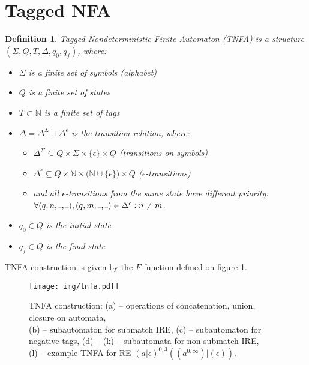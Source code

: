 \documentclass[AMA,STIX1COL]{WileyNJD-v2}
\newcommand{\Xund}{\rule{.4em}{.4pt}}
\newcommand{\YN}{\mathbb{N}}
\newtheorem{Xdef}{Definition}
\begin{document}
\FloatBarrier


\section{Tagged NFA}

    \begin{Xdef}
    \emph{Tagged Nondeterministic Finite Automaton (TNFA)}
    is a structure $(\Sigma, Q, T, \Delta, q_0, q_f)$, where:
    \begin{itemize}
        \item[] $\Sigma$ is a finite set of symbols (\emph{alphabet})
        \item[] $Q$ is a finite set of \emph{states}
        \item[] $T\subset\YN$ is a finite set of \emph{tags}
        \item[] $\Delta = \Delta^\Sigma \sqcup \Delta^\epsilon$ is the \emph{transition} relation, where:
        \begin{itemize}
            \item[] $\Delta^\Sigma \subseteq Q \times \Sigma \times \{\epsilon\} \times Q$ (transitions on symbols)
            \item[] $\Delta^\epsilon \subseteq Q \times \YN \times \big( \YN \cup \{\epsilon\} \big) \times Q$ ($\epsilon$-transitions)
            \item[]
                and all $\epsilon$-transitions from the same state have different priority:
                $\forall (q, n, \Xund, \Xund), (q, m, \Xund, \Xund) \in \Delta^\epsilon: n \neq m$.
        \end{itemize}
        \item[] $q_0 \in Q$ is the \emph{initial} state
        \item[] $q_f \in Q$ is the \emph{final} state
    \end{itemize}
    \end{Xdef}

TNFA construction is given by the $F$ function defined on figure \ref{fig_tnfa}.

\begin{figure}\label{fig_tnfa}
\texttt{[image: img/tnfa.pdf]}
\caption{
TNFA construction:
(a) -- operations of concatenation, union, closure on automata, \\
(b) -- subautomaton for submatch IRE,
(c) -- subautomaton for negative tags,
(d) -- (k) -- subautomata for non-submatch IRE, \\
(l) -- example TNFA for RE $(a|\epsilon)^{0,3}((a^{0,\infty})|(\epsilon))$.
}
\end{figure}
\end{document}
